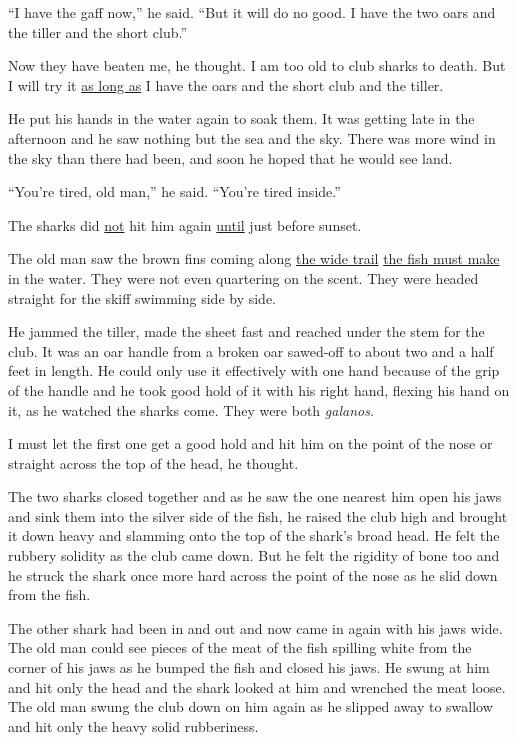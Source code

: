\documentclass[fontset=ubuntu,zihao=-4]{ctexrep}
\begin{document}
``I have the gaff now,'' he said. ``But it will do no good. I have the two
oars and the tiller and the short club.''

Now they have beaten me, he thought. I am too old to club sharks to death.
But I will try it \uline{as long as} I have the oars and the short club and the
tiller.

He put his hands in the water again to soak them. It was getting late in the
afternoon and he saw nothing but the sea and the sky. There was more wind in
the sky than there had been, and soon he hoped that he would see land.

``You're tired, old man,'' he said. ``You're tired inside.''

The sharks did \uline{not} hit him again \uline{until} just before sunset.

The old man saw the brown fins coming along \uline{the wide trail} \uline{the fish
  must make} in the water. They were not even quartering on the scent. They
were headed straight for the skiff swimming side by side.

He jammed the tiller, made the sheet fast and reached under the stem for the
club. It was an oar handle from a broken oar \gls{sawed-off} to about two
and a half feet in length. He could only use it \gls{effectively} with one
hand because of the \gls{grip} of the handle and he took good hold of it with his
right hand, \gls{flexing} his hand on it, as he watched the sharks come.
They were both \emph{galanos}.

I must let the first one get a good hold and hit him on the point of the
nose or straight across the top of the head, he thought.

The two sharks closed together and as he saw the one nearest him open his
jaws and \gls{sink} them into the silver side of the fish, he raised the club high
and brought it down heavy and \gls{slamming} onto the top of the shark's
broad head. He felt the \gls{rubbery} \gls{solidity} as the club came down.
But he felt the \gls{rigidity} of bone too and he struck the shark once more
hard across the point of the nose as he slid down from the fish.

The other shark had been in and out and now came in again with his jaws
wide. The old man could see pieces of the meat of the fish \gls{spilling}
white from the corner of his jaws as he bumped the fish and closed his jaws.
He swung at him and hit only the head and the shark looked at him and
\gls{wrenched} the meat loose. The old man swung the club down on him again as he
slipped away to swallow and hit only the heavy solid \gls{rubberiness}.
\end{document}
